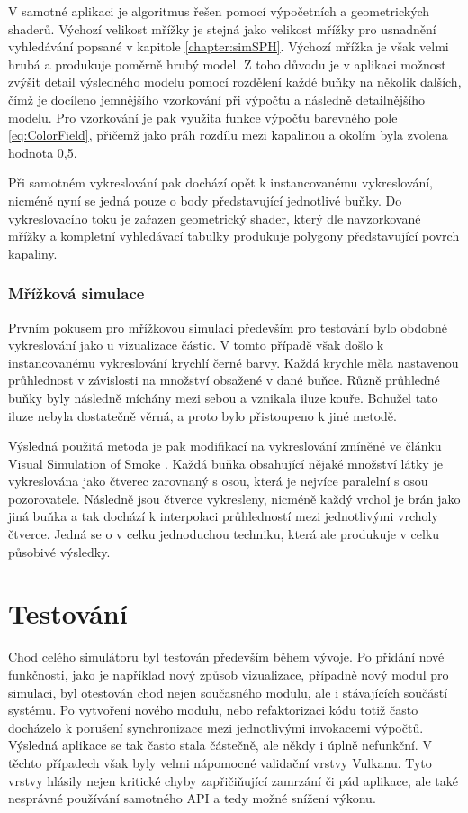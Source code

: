 V samotné aplikaci je algoritmus řešen pomocí výpočetních a geometrických shaderů. Výchozí velikost mřížky je stejná jako velikost mřížky pro usnadnění vyhledávání popsané v kapitole \ref{chapter:simSPH}. Výchozí mřížka je však velmi hrubá a produkuje poměrně hrubý model. Z toho důvodu je v aplikaci možnost zvýšit detail výsledného modelu pomocí rozdělení každé buňky na několik dalších, čímž je docíleno jemnějšího vzorkování při výpočtu a následně detailnějšího modelu. Pro vzorkování je pak využita funkce výpočtu barevného pole \ref{eq:ColorField}, přičemž jako práh rozdílu mezi kapalinou a okolím byla zvolena hodnota 0,5.

Při samotném vykreslování pak dochází opět k instancovanému vykreslování, nicméně nyní se jedná pouze o body představující jednotlivé buňky. Do vykreslovacího toku je zařazen geometrický shader, který dle navzorkované mřížky a kompletní vyhledávací tabulky produkuje polygony představující povrch kapaliny.

\subsection{Mřížková simulace}
\label{chapter:vizGrid}
Prvním pokusem pro mřížkovou simulaci především pro testování bylo obdobné vykreslování jako u vizualizace částic. V tomto případě však došlo k instancovanému vykreslování krychlí černé barvy. Každá krychle měla nastavenou průhlednost v závislosti na množství obsažené v dané buňce. Různě průhledné buňky byly následně míchány mezi sebou a vznikala iluze kouře. Bohužel tato iluze nebyla dostatečně věrná, a proto bylo přistoupeno k jiné metodě.

Výsledná použitá metoda je pak modifikací na vykreslování zmíněné ve článku Visual Simulation of Smoke \cite{visualSmoke}. Každá buňka obsahující nějaké množství látky je vykreslována jako čtverec zarovnaný s osou, která je nejvíce paralelní s osou pozorovatele. Následně jsou čtverce vykresleny, nicméně každý vrchol je brán jako jiná buňka a tak dochází k interpolaci průhledností mezi jednotlivými vrcholy čtverce. Jedná se o v celku jednoduchou techniku, která ale produkuje v celku působivé výsledky.

\chapter{Testování}
\label{chapter:testovani}
Chod celého simulátoru byl testován především během vývoje. Po přidání nové funkčnosti, jako je například nový způsob vizualizace, případně nový modul pro simulaci, byl otestován chod nejen současného modulu, ale i stávajících součástí systému. Po vytvoření nového modulu, nebo refaktorizaci kódu totiž často docházelo k porušení synchronizace mezi jednotlivými invokacemi výpočtů. Výsledná aplikace se tak často stala částečně, ale někdy i úplně nefunkční. V těchto případech však byly velmi nápomocné validační vrstvy Vulkanu. Tyto vrstvy hlásily nejen kritické chyby zapřičiňující zamrzání či pád aplikace, ale také nesprávné používání samotného API a tedy možné snížení výkonu.

